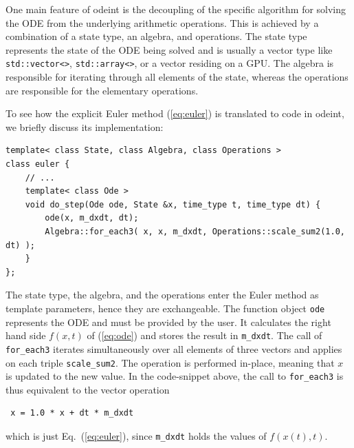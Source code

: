 \documentclass[final]{siamltex}
\newcommand{\code}[1]{\lstinline$#1$}
\newcommand{\eqref}[1]{(\ref{#1})}
\begin{document}
One main feature of odeint is the decoupling of the specific algorithm
for solving the ODE from the underlying arithmetic operations. This
is achieved by a combination of a state type, an algebra, and
operations. The state type represents the state of the ODE being
solved and is usually a vector type like \code{std::vector<>},
\code{std::array<>}, or a vector residing on a GPU. The algebra is
responsible for iterating through all elements of the state, whereas
the operations are responsible for the elementary operations.

To see how the explicit Euler method \eqref{eq:euler} is translated to
code in odeint, we briefly discuss its implementation:
\begin{lstlisting}
template< class State, class Algebra, class Operations >
class euler {
    // ...
    template< class Ode >
    void do_step(Ode ode, State &x, time_type t, time_type dt) {
        ode(x, m_dxdt, dt);
        Algebra::for_each3( x, x, m_dxdt, Operations::scale_sum2(1.0, dt) );
    }
};
\end{lstlisting}
The state type, the algebra, and the operations enter the Euler method
as template parameters, hence they are exchangeable. The function
object \code{ode} represents the ODE and must be provided by the
user. It calculates the right hand side $f(x,t)$ of \eqref{eq:ode} and
stores the result in \code{m_dxdt}.  The call of \code{for_each3}
iterates simultaneously over all elements of three vectors and applies
on each triple \code{scale_sum2}. The operation is performed in-place,
meaning that $x$ is updated to the new value.  In the code-snippet
above, the call to \code{for_each3} is thus equivalent to the vector
operation
\begin{lstlisting}
 x = 1.0 * x + dt * m_dxdt
\end{lstlisting}
which is just Eq.~\eqref{eq:euler}, since \code{m_dxdt} holds the values of
$f(x(t), t)$.
\end{document}
